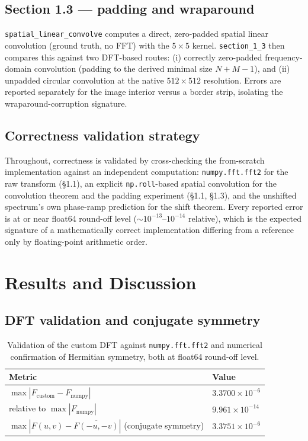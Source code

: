 \documentclass[11pt]{article}
\begin{document}
\subsection{Section 1.3 — padding and wraparound}

\texttt{spatial\_linear\_convolve} computes a direct, zero-padded spatial linear convolution
(ground truth, no FFT) with the $5\times5$ kernel. \texttt{section\_1\_3} then compares this
against two DFT-based routes: (i) correctly zero-padded frequency-domain convolution (padding to
the derived minimal size $N+M-1$), and (ii) unpadded circular convolution at the native
$512\times512$ resolution. Errors are reported separately for the image interior versus a
border strip, isolating the wraparound-corruption signature.

\subsection{Correctness validation strategy}

Throughout, correctness is validated by cross-checking the from-scratch implementation against
an independent computation: \texttt{numpy.fft.fft2} for the raw transform (\S1.1), an explicit
\texttt{np.roll}-based spatial convolution for the convolution theorem and the padding experiment
(\S1.1, \S1.3), and the unshifted spectrum's own phase-ramp prediction for the shift theorem.
Every reported error is at or near float64 round-off level ($\sim\!10^{-13}$--$10^{-14}$
relative), which is the expected signature of a mathematically correct implementation differing
from a reference only by floating-point arithmetic order.

\section{Results and Discussion}

\subsection{DFT validation and conjugate symmetry}

\begin{table}[H]
\centering
\begin{tabular}{@{}ll@{}}
\toprule
Metric & Value \\
\midrule
$\max|F_\text{custom}-F_\text{numpy}|$ & $3.3700\times10^{-6}$ \\
relative to $\max|F_\text{numpy}|$ & $9.961\times10^{-14}$ \\
$\max|F(u,v)-\overline{F(-u,-v)}|$ (conjugate symmetry) & $3.3751\times10^{-6}$ \\
\bottomrule
\end{tabular}
\caption{Validation of the custom DFT against \texttt{numpy.fft.fft2} and numerical confirmation
of Hermitian symmetry, both at float64 round-off level.}
\label{tab:validation}
\end{table}
\end{document}
